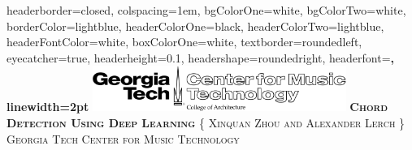 \documentclass[landscape,archE1,fontscale=0.315]{baposter} %
\begin{document}
\begin{poster}
{
headerborder=closed, %
colspacing=1em, %
bgColorOne=white, %
bgColorTwo=white, %
borderColor=lightblue, %
headerColorOne=black, %
headerColorTwo=lightblue, %
headerFontColor=white, %
boxColorOne=white, %
textborder=roundedleft, %
eyecatcher=true, %
headerheight=0.1\textheight, %
headershape=roundedright, %
headerfont=\Large\bf\textsc, %
linewidth=2pt %
}
%
{\includegraphics[height=4em]{gtcmt}} %
{\bf\textsc{Chord Detection Using Deep Learning}\vspace{0.5em}} %
{\textsc{\{ Xinquan Zhou and Alexander Lerch \} \hspace{12pt} Georgia Tech Center for Music Technology}} %


\end{poster}
\end{document}
